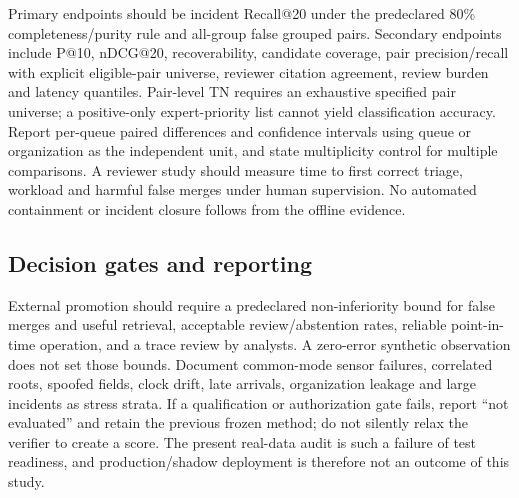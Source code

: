 Primary endpoints should be incident Recall@20 under the predeclared 80\% completeness/purity rule and all-group false grouped pairs. Secondary endpoints include P@10, nDCG@20, recoverability, candidate coverage, pair precision/recall with explicit eligible-pair universe, reviewer citation agreement, review burden and latency quantiles. Pair-level TN requires an exhaustive specified pair universe; a positive-only expert-priority list cannot yield classification accuracy. Report per-queue paired differences and confidence intervals using queue or organization as the independent unit, and state multiplicity control for multiple comparisons. A reviewer study should measure time to first correct triage, workload and harmful false merges under human supervision. No automated containment or incident closure follows from the offline evidence.

\subsection{Decision gates and reporting}
External promotion should require a predeclared non-inferiority bound for false merges and useful retrieval, acceptable review/abstention rates, reliable point-in-time operation, and a trace review by analysts. A zero-error synthetic observation does not set those bounds. Document common-mode sensor failures, correlated roots, spoofed fields, clock drift, late arrivals, organization leakage and large incidents as stress strata. If a qualification or authorization gate fails, report ``not evaluated'' and retain the previous frozen method; do not silently relax the verifier to create a score. The present real-data audit is such a failure of test readiness, and production/shadow deployment is therefore not an outcome of this study.
